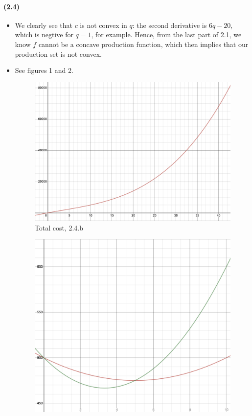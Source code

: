 \documentclass[10pt,letter]{article}
\begin{document}
\paragraph{(2.4)}
\begin{itemize}
\item We clearly see that $c$ is not convex in $q$: the second derivative is $6q-20$, which is negtive for $q=1$, for example. Hence, from the last part of 2.1, we know $f$ cannot be a concave production function, which then implies that our production set is not convex.
\item See figures 1 and 2.
\begin{figure}
\centering
\includegraphics[scale=0.4]{ps5fig1}
\caption{Total cost, 2.4.b}
\end{figure}
\begin{figure}
\centering
\includegraphics[scale=0.4]{ps5fig2}

\end{figure}
\end{itemize}
\end{document}

